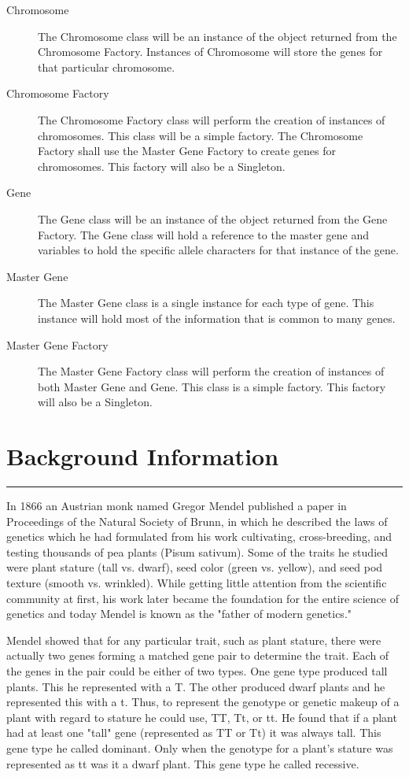 \documentclass{article}
\begin{document}
\begin{description}
\item[Chromosome] The Chromosome class will be an instance of the object returned from the Chromosome Factory. Instances of Chromosome will store the genes for that particular chromosome. 

\item[Chromosome Factory] The Chromosome Factory class will perform the creation of instances of chromosomes. This class will be a simple factory. The Chromosome Factory shall use the Master Gene Factory to create genes for chromosomes. This factory will also be a Singleton.

\item[Gene] The Gene class will be an instance of the object returned from the Gene Factory. The Gene class will hold a reference to the master gene and variables to hold the specific allele characters for that instance of the gene.

\item[Master Gene] The Master Gene class is a single instance for each type of gene. This instance will hold most of the information that is common to many genes.

\item[Master Gene Factory] The Master Gene Factory class will perform the creation of instances of both Master Gene and Gene. This class is a simple factory. This factory will also be a Singleton.

\end{description}

\section{Background Information}
\hrule
In 1866 an Austrian monk named Gregor Mendel published a paper in Proceedings of the Natural Society of Brunn, in which he described the laws of genetics which he had formulated from his work cultivating, cross-breeding, and testing thousands of pea plants (Pisum sativum). Some of the traits he studied were plant stature (tall vs. dwarf), seed color (green vs. yellow), and seed pod texture (smooth vs. wrinkled). While getting little attention from the scientific community at first, his work later became the foundation for the entire science of genetics and today Mendel is known as the "father of modern genetics."

Mendel showed that for any particular trait, such as plant stature, there were actually two genes forming a matched gene pair to determine the trait. Each of the genes in the pair could be either of two types. One gene type produced tall plants. This he represented with a T. The other produced dwarf plants and he represented this with a t. Thus, to represent the genotype or genetic makeup of a plant with regard to stature he could use, TT, Tt, or tt. He found that if a plant had at least one "tall" gene (represented as TT or Tt) it was always tall. This gene type he called dominant. Only when the genotype for a plant’s stature was represented as tt was it a dwarf plant. This gene type he called recessive. 
\end{document}

